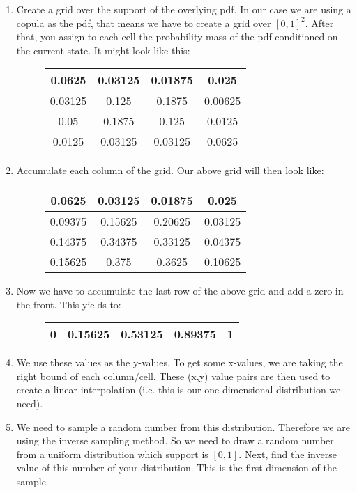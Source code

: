 \begin{enumerate}
	\item Create a grid over the support of the overlying pdf. In our case we are using a copula as the pdf, that means we have to create a grid over $[0,1]^2$. After that, you assign to each cell the probability mass of the pdf conditioned on the current state. It might look like this:
	\begin{figure}[H]
		\centering
		\begin{tabular}{|c|c|c|c|} \hline
			0.0625 & 0.03125 & 0.01875 & 0.025 \\ \hline
			0.03125 & 0.125 & 0.1875 & 0.00625\\ \hline
			0.05 & 0.1875 & 0.125 & 0.0125 \\ \hline
			0.0125 & 0.03125 & 0.03125 & 0.0625 \\ \hline
		\end{tabular}
	\end{figure}
	\item Accumulate each column of the grid. Our above grid will then look like:
	\begin{figure}[H]
		\centering
		\begin{tabular}{|c||c||c||c|} \hline
			0.0625 & 0.03125 & 0.01875 & 0.025 \\ \hline
			0.09375 & 0.15625 & 0.20625 & 0.03125\\ \hline
			0.14375 & 0.34375 & 0.33125 & 0.04375 \\ \hline
			0.15625 & 0.375 & 0.3625 & 0.10625 \\ \hline
		\end{tabular}
	\end{figure}
	\item Now we have to accumulate the last row of the above grid and add a zero in the front. This yields to:
	\begin{figure}[H]
		\centering
		\begin{tabular}{|c|c|c|c|c|} \hline
			0 & 0.15625 & 0.53125 & 0.89375 & 1 \\ \hline
		\end{tabular}
	\end{figure}
	\item We use these values as the y-values. To get some x-values, we are taking the right bound of each column/cell. These (x,y) value pairs are then used to create a linear interpolation (i.e. this is our one dimensional distribution we need).
	\item We need to sample a random number from this distribution. Therefore we are using the inverse sampling method. So we need to draw a random number from a uniform distribution which support is $[0,1]$. Next, find the inverse value of this number of your distribution. This is the first dimension of the sample.

\end{enumerate}
